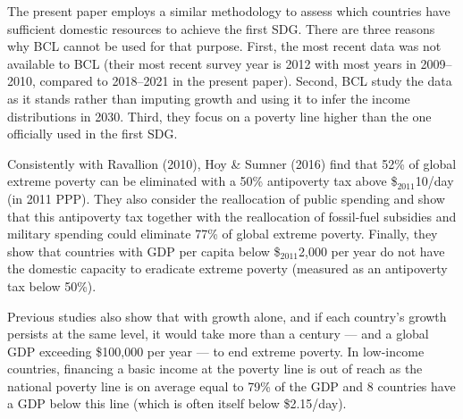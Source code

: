 The present paper employs a similar methodology to assess which countries have sufficient domestic resources to achieve the first SDG. There are three reasons why BCL cannot be used %
for that purpose. 
First, the most recent data was not available to BCL (their most recent survey year is 2012 with most years in 2009--2010, compared to 2018--2021 in the present paper). %
Second, BCL study the data as it stands rather than imputing growth and using it to infer the income distributions in 2030. Third, they focus on a poverty line higher than the one officially used in the first SDG.

Consistently with Ravallion (2010), Hoy \& Sumner (2016) find that 52\% of global extreme poverty can be eliminated with a 50\% antipoverty tax above \$$_\text{2011}$10/day (in 2011 PPP). They also consider the reallocation of public spending and show that this antipoverty tax together with the reallocation of fossil-fuel subsidies and military spending could eliminate 77\% of global extreme poverty. Finally, they show that countries with GDP per capita below \$$_\text{2011}$2,000 per year do not have the domestic capacity to eradicate extreme poverty (measured as an antipoverty tax below 50\%).\cite{hoy_gasoline_2016} 

Previous studies also show that with growth alone, and if each country's growth persists at the same level, it would take more than a century --- and a global GDP exceeding \$100,000 per year --- to end extreme poverty.\cite{woodward_incrementum_2015} %
In low-income countries, financing a basic income at the poverty line is out of reach as the national poverty line is on average equal to 79\% of the GDP and 8 countries have a GDP below this line (which is often itself below \$2.15/day).\cite{ortiz_universal_2018}

